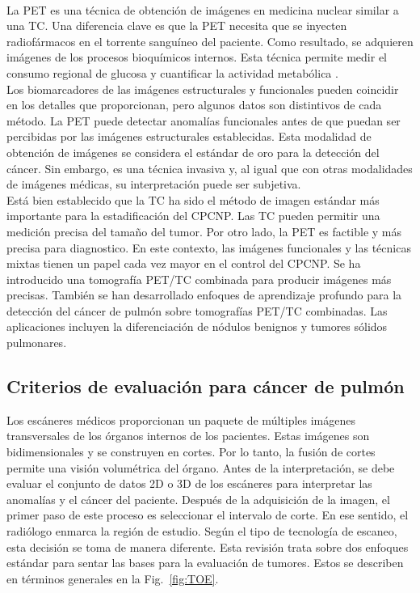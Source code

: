\documentclass[11pt,a4paper,openany]{article}
\begin{document}
        \\
        La PET es una técnica de obtención de imágenes en medicina nuclear similar a una TC. Una diferencia clave es que la PET necesita que se inyecten radiofármacos en el torrente sanguíneo del paciente. Como resultado, se adquieren imágenes de los procesos bioquímicos internos. Esta técnica permite medir el consumo regional de glucosa y cuantificar la actividad metabólica \cite{Guaman2024}.\\
        Los biomarcadores de las imágenes estructurales y funcionales pueden coincidir en los detalles que proporcionan, pero algunos datos son distintivos de cada método. La PET puede detectar anomalías funcionales antes de que puedan ser percibidas por las imágenes estructurales establecidas. Esta modalidad de obtención de imágenes se considera el estándar de oro para la detección del cáncer. Sin embargo, es una técnica invasiva y, al igual que con otras modalidades de imágenes médicas, su interpretación puede ser subjetiva. \\

        Está bien establecido que la TC ha sido el método de imagen estándar más importante para la estadificación del CPCNP. Las TC pueden permitir una medición precisa del tamaño del tumor. Por otro lado, la PET es factible y más precisa para diagnostico. En este contexto, las imágenes funcionales y las técnicas mixtas tienen un papel cada vez mayor en el control del CPCNP. Se ha introducido una tomografía PET/TC combinada para producir imágenes más precisas. También se han desarrollado enfoques de aprendizaje profundo para la detección del cáncer de pulmón sobre tomografías PET/TC combinadas. Las aplicaciones incluyen la diferenciación de nódulos benignos y tumores sólidos pulmonares.\\

        
    \subsection{Criterios de evaluación para cáncer de pulmón}\label{Section:TEM}
    Los escáneres médicos proporcionan un paquete de múltiples imágenes transversales de los órganos internos de los pacientes. Estas imágenes son bidimensionales y se construyen en cortes. Por lo tanto, la fusión de cortes permite una visión volumétrica del órgano. Antes de la interpretación, se debe evaluar el conjunto de datos 2D o 3D de los escáneres para interpretar las anomalías y el cáncer del paciente. Después de la adquisición de la imagen, el primer paso de este proceso es seleccionar el intervalo de corte. En ese sentido, el radiólogo enmarca la región de estudio. Según el tipo de tecnología de escaneo, esta decisión se toma de manera diferente. Esta revisión trata sobre dos enfoques estándar para sentar las bases para la evaluación de tumores. Estos se describen en términos generales en la Fig.~\ref{fig:TOE}.
\end{document}
